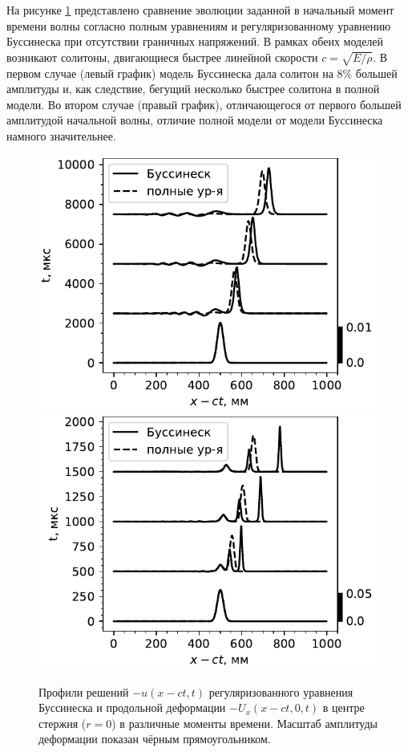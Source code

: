 \documentclass[12pt, a4paper]{article}
\begin{document}


На рисунке \ref{fig:evol_compare} представлено сравнение эволюции заданной в начальный момент времени волны согласно полным уравнениям и регуляризованному уравнению Буссинеска при отсутствии граничных напряжений. В рамках обеих моделей возникают солитоны, двигающиеся быстрее линейной скорости $c=\sqrt{E/\rho}$. В первом случае (левый график) модель Буссинеска дала солитон на 8\% большей амплитуды и, как следствие, бегущий несколько быстрее солитона в полной модели. Во втором случае (правый график), отличающегося от первого большей амплитудой начальной волны, отличие полной модели от модели Буссинеска намного значительнее. 
\begin{figure}[h]
	\centering
	\includegraphics[width=0.44\linewidth]{figures/SolEvolCompareSmall}
	\includegraphics[width=0.44\linewidth]{figures/SolEvolCompareSmall2}
	\caption{Профили решений $-u(x-ct, t)$ регуляризованного уравнения Буссинеска и продольной деформации $-U_x(x - ct, 0, t)$ в центре стержня ($r=0$) в различные моменты времени. Масштаб амплитуды деформации показан чёрным прямоугольником.}
	\label{fig:evol_compare}
	\vspace{-2mm}
\end{figure}
\end{document}
